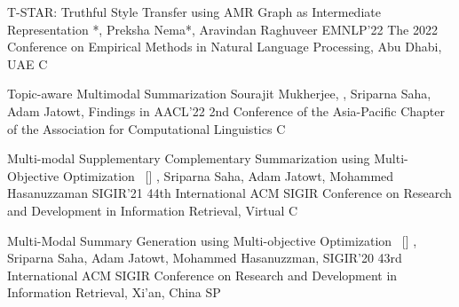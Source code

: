 
\begin{publications}

\publication
	{T-STAR: Truthful Style Transfer using AMR Graph as Intermediate Representation}{}
	{\underline{}*, Preksha Nema*, Aravindan Raghuveer}
	{EMNLP'22} {The 2022 Conference on Empirical Methods in Natural Language Processing, Abu Dhabi, UAE} {C}

\publication
	{Topic-aware Multimodal Summarization}{}
	{Sourajit Mukherjee, \underline{}, Sriparna Saha, Adam Jatowt,}
	{Findings in AACL'22} {2nd Conference of the Asia-Pacific Chapter of the Association for Computational Linguistics} {C}

\publication
	{Multi-modal Supplementary Complementary Summarization using Multi-Objective Optimization}{~ [\href{https://doi.org/10.1145/3404835.3462877}{\small{\linkSymbol}}]}
	{\underline{}, Sriparna Saha, Adam Jatowt, Mohammed Hasanuzzaman}
	{SIGIR'21} {44th International ACM SIGIR Conference on Research and Development in Information Retrieval, Virtual} {C}

\publication
	{Multi-Modal Summary Generation using Multi-objective Optimization}{~ [\href{https://doi.org/10.1145/3397271.3401232}{\small{\linkSymbol}}]}
	{\underline{}, Sriparna Saha, Adam Jatowt, Mohammed Hasanuzzman,}
	{SIGIR'20} {43rd International ACM SIGIR Conference on Research and Development in Information Retrieval, Xi'an, China} {SP}

\end{publications}

\vspace{-3mm}